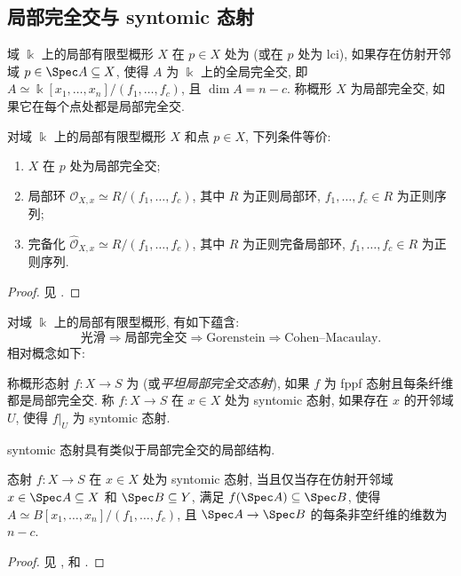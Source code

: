 \subsection{局部完全交与 syntomic 态射}\label{src:A.3.5-subsection}
\begin{definition}\label{src:A.3.15}
域 $\Bbbk$ 上的局部有限型概形 $X$ 在 $p\in X$ 处为 (或在 $p$ 处为 lci), 如果存在仿射开邻域 $p\in\Spec A\subseteq X$, 使得 $A$ 为 $\Bbbk$ 上的全局完全交, 即 $A\simeq\Bbbk[x_1,\ldots,x_n]/(f_1,\ldots,f_c)$, 且 $\dim A=n-c$. 称概形 $X$ 为局部完全交, 如果它在每个点处都是局部完全交.
\end{definition}
\begin{proposition}\label{src:A.3.16}
对域 $\Bbbk$ 上的局部有限型概形 $X$ 和点 $p\in X$, 下列条件等价:
\begin{enumerate}[(1)]
\item $X$ 在 $p$ 处为局部完全交;
\item 局部环 $\mathcal O_{X,x}\simeq R/(f_1,\ldots,f_c)$, 其中 $R$ 为正则局部环, $f_1,\ldots,f_c\in R$ 为正则序列;
\item 完备化 $\widehat{\mathcal O}_{X,x}\simeq R/(f_1,\ldots,f_c)$, 其中 $R$ 为正则完备局部环, $f_1,\ldots,f_c\in R$ 为正则序列.
\end{enumerate}
\end{proposition}
\begin{proof}
见 \cite[Tags 00S8, 09PY]{SP}.
\end{proof}
对域 $\Bbbk$ 上的局部有限型概形, 有如下蕴含:
\[
\text{光滑}\Longrightarrow\text{局部完全交}\Longrightarrow\text{Gorenstein}\Longrightarrow\text{Cohen--Macaulay}.
\]
相对概念如下:
\begin{definition}\label{src:A.3.17}
称概形态射 $f:X\to S$ 为  (或\textit{平坦局部完全交态射}), 如果 $f$ 为 fppf 态射且每条纤维都是局部完全交. 称 $f:X\to S$ 在 $x\in X$ 处为 syntomic 态射, 如果存在 $x$ 的开邻域 $U$, 使得 $f|_U$ 为 syntomic 态射.
\end{definition}
syntomic 态射具有类似于局部完全交的局部结构.
\begin{proposition}\label{src:A.3.18}
态射 $f:X\to S$ 在 $x\in X$ 处为 syntomic 态射, 当且仅当存在仿射开邻域 $x\in\Spec A\subseteq X$ 和 $\Spec B\subseteq Y$, 满足 $f(\Spec A)\subseteq\Spec B$, 使得 $A\simeq B[x_1,\ldots,x_n]/(f_1,\ldots,f_c)$, 且 $\Spec A\to\Spec B$ 的每条非空纤维的维数为 $n-c$.
\end{proposition}
\begin{proof}
见 \cite[IV$_4$ \S$19.3$]{EGA}, \cite[VIII \S$1$]{SGA6} 和 \cite[Tag 01UB]{SP}.
\end{proof}
